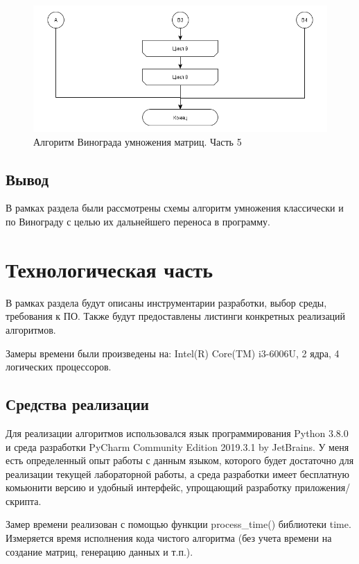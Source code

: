 \documentclass[a4paper,12pt]{report}
\begin{document}
	\newpage

	\begin{figure}[h!]
		\centering
		\includegraphics[width=0.8\linewidth]{part51.png}
		\caption{Алгоритм Винограда умножения матриц. Часть 5}
		\label{ris:wino5}
	\end{figure}
	
	\section{Вывод}

		В рамках раздела были рассмотрены схемы алгоритм умножения классически и по Винограду с целью их дальнейшего переноса в программу.

    \newpage

    \chapter{Технологическая часть}
        \label{sec:tecnologic_part}

        	В рамках раздела будут описаны инструментарии разработки, выбор среды, требования к ПО. 
        	Также будут предоставлены листинги конкретных реализаций алгоритмов.
        	
        	Замеры времени были произведены на: Intel(R) Core(TM) i3-6006U, 2 ядра, 4 логических процессоров.

	\section{Средства реализации}

        	Для реализации алгоритмов использовался язык программирования Python 3.8.0 и среда разработки PyCharm Community Edition 2019.3.1 by JetBrains. 
        	У меня есть определенный опыт работы с данным языком, которого будет достаточно для реализации текущей лабораторной работы, а среда разработки имеет бесплатную комьюнити версию и удобный интерфейс, упрощающий разработку приложения/скрипта.
        	
        	Замер времени реализован с помощью функции process\_time() библиотеки time.
        	Измеряется время исполнения кода чистого алгоритма (без учета времени на создание матриц, генерацию данных и т.п.).\\
		
\end{document}
